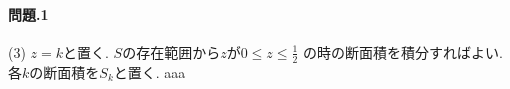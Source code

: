 \documentclass[11pt]{jarticle}
\begin{document}
\title{}
\date{}
\maketitle
\paragraph{問題.1}
(3) $z=k$と置く. $S$の存在範囲から$z$が$0\leq z \leq \frac{1}{2}$
の時の断面積を積分すればよい. 各$k$の断面積を$S_k$と置く. aaa
\end{document}
